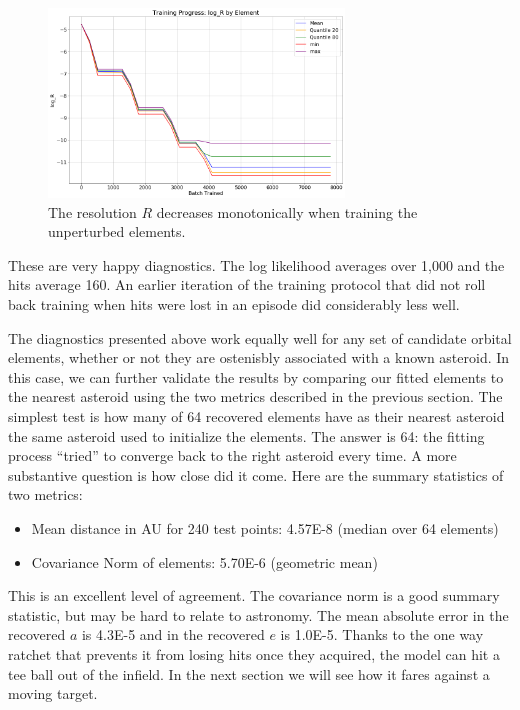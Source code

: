 \begin{figure}[hbt!]
\begin{center}
\includegraphics[width=0.7\textwidth]{../figs/search_known/unperturbed/learning_curve_log_R.png}
\end{center}
\caption{The resolution $R$ decreases monotonically when training the unperturbed elements.}
\label{fig:TrainUnperturbedRes}
\end{figure}
These are very happy diagnostics.  The log likelihood averages over 1,000 and the hits average 160.
An earlier iteration of the training protocol that did not roll back training when hits were 
lost in an episode did considerably less well.

The diagnostics presented above work equally well for any set of candidate orbital elements,
whether or not they are ostenisbly associated with a known asteroid.
In this case, we can further validate the results by comparing our fitted elements to the nearest asteroid
using the two metrics described in the previous section.
The simplest test is how many of 64 recovered elements have as their nearest asteroid the same asteroid used to initialize the elements.
The answer is 64: the fitting process ``tried'' to converge back to the right asteroid every time.
A more substantive question is how close did it come.  
Here are the summary statistics of two metrics:
\begin{itemize}
\item Mean distance in AU for 240 test points: 4.57E-8 (median over 64 elements)
\item Covariance Norm of elements: 5.70E-6 (geometric mean)
\end{itemize}
This is an excellent level of agreement.
The covariance norm is a good summary statistic, but may be hard to relate to astronomy.
The mean absolute error in the recovered $a$ is 4.3E-5 and in the recovered $e$ is 1.0E-5.
Thanks to the one way ratchet that prevents it from losing hits once they acquired, 
the model can hit a tee ball out of the infield.
In the next section we will see how it fares against a moving target.

